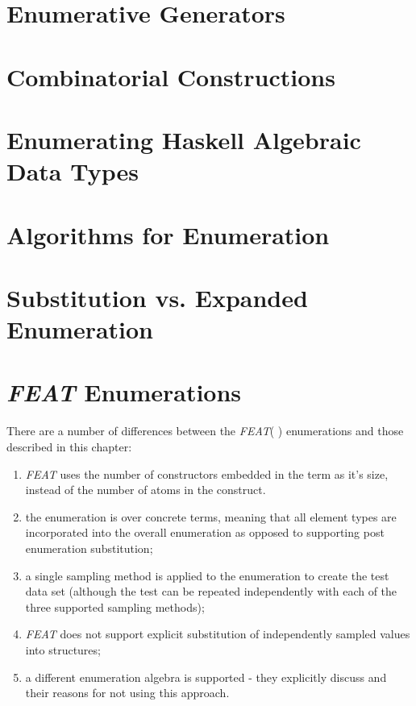 \documentclass[11pt]{report}
\newcommand{\FEAT}{\textit{FEAT}\xspace}
\begin{document}
\section{Enumerative Generators}\label{sec:enumerations}


\section{Combinatorial Constructions}\label{sec:combconstructs}


\section{Enumerating Haskell Algebraic Data Types}


\section{Algorithms for Enumeration}\label{sec:iterenumalg}


\section{Substitution vs. Expanded Enumeration}



\section{\FEAT Enumerations}

There are a number of differences between the \FEAT (\cite{Duregard2012} ) enumerations
and those described in this chapter:

\begin{enumerate}
\item \FEAT uses the number of constructors embedded in the term as it's size,
instead of the number of atoms in the construct.
\item the enumeration is over concrete terms, meaning that all element types are incorporated into the overall enumeration
as opposed to supporting post enumeration substitution;
\item  a single sampling method is applied to the enumeration to create the test data set
(although the test can be repeated independently with each of the three supported sampling methods);
\item \FEAT does not support explicit substitution of independently sampled values into structures;
\item a different enumeration algebra is supported - 
they explicitly discuss \cite{FlSa95} and their reasons for not using this approach.
\end{enumerate}
\end{document}
